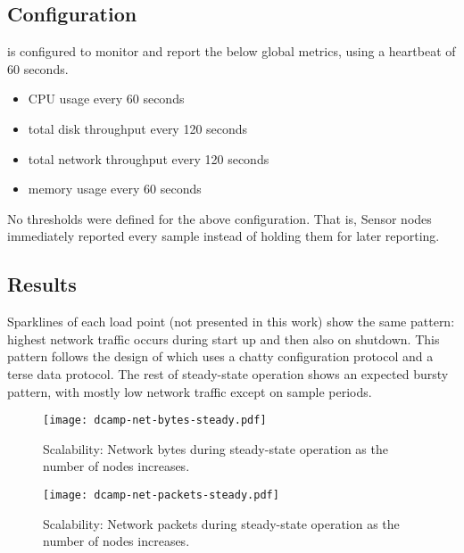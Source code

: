 \subsection{\dcamp Configuration}

\dcamp is configured to monitor and report the below global metrics, using a heartbeat of 60 seconds.

\begin{itemize}
\item CPU usage every 60 seconds
\item total disk throughput every 120 seconds
\item total network throughput every 120 seconds
\item memory usage every 60 seconds
\end{itemize}

No thresholds were defined for the above configuration. That is, Sensor nodes immediately reported every sample instead
of holding them for later reporting.

\subsection{Results}

Sparklines of each load point (not presented in this work) show the same pattern: highest network traffic occurs during
start up and then also on shutdown. This pattern follows the design of \dcamp which uses a chatty configuration protocol
and a terse data protocol. The rest of steady-state operation shows an expected bursty pattern, with mostly low network
traffic except on sample periods.

\begin{figure}[H]
    \centering
    \vspace{-20pt}
    \texttt{[image: dcamp-net-bytes-steady.pdf]}
    \vspace{-40pt}
    \caption[Scalability: Steady-State Network Bytes]
            {Scalability: Network bytes during steady-state operation as the number of \dcamp nodes increases.}
    \label{fig:net_bytes_steady_graph}
\end{figure}

\begin{figure}[H]
    \centering
    \vspace{-20pt}
    \texttt{[image: dcamp-net-packets-steady.pdf]}
    \vspace{-40pt}
    \caption[Scalability: Steady-State Network Packets]
	    {Scalability: Network packets during steady-state operation as the number of \dcamp nodes increases.}
    \label{fig:net_packets_steady_graph}
\end{figure}

